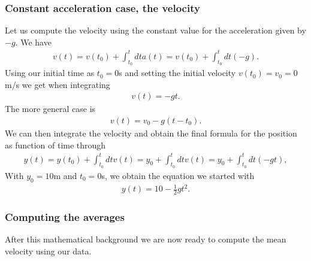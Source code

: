 \documentclass[letterpaper,10pt,english]{sphinxmanual}
\begin{document}
\subsubsection{Constant acceleration case, the velocity}
\label{\detokenize{chapter2:constant-acceleration-case-the-velocity}}
Let us compute the velocity using the constant value for the acceleration given by \(-g\). We have
\begin{equation*}
\begin{split}
v(t)=v(t_0)+\int_{t_0}^t dt a(t)=v(t_0)+\int_{t_0}^t dt (-g).
\end{split}
\end{equation*}
Using our initial time as \(t_0=0\)s and setting the initial velocity \(v(t_0)=v_0=0\)m/s we get when integrating
\begin{equation*}
\begin{split}
v(t)=-gt.
\end{split}
\end{equation*}
The more general case is
\begin{equation*}
\begin{split}
v(t)=v_0-g(t-t_0).
\end{split}
\end{equation*}
We can then integrate the velocity and obtain the final formula for the position as function of time through
\begin{equation*}
\begin{split}
y(t)=y(t_0)+\int_{t_0}^t dt v(t)=y_0+\int_{t_0}^t dt v(t)=y_0+\int_{t_0}^t dt (-gt),
\end{split}
\end{equation*}
With \(y_0=10\)m and \(t_0=0\)s, we obtain the equation we started with
\begin{equation*}
\begin{split}
y(t)=10-\frac{1}{2}gt^2.
\end{split}
\end{equation*}

\subsubsection{Computing the averages}
\label{\detokenize{chapter2:computing-the-averages}}
After this mathematical background we are now ready to compute the mean velocity using our data.
\end{document}
